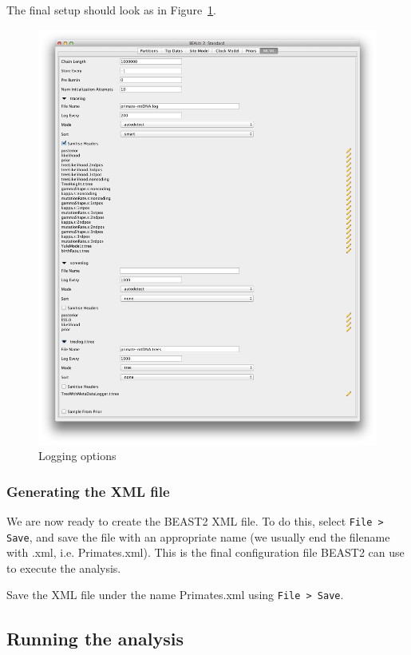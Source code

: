 \documentclass[11pt]{article}
\begin{document}
The final setup should look as in Figure~\ref{fig:logs}.

\begin{figure}[H]
\centering
\includegraphics[width=5in]{figures/logs.png}
\caption{\small Logging options}
\label{fig:logs}
\end{figure}

\subsubsection{Generating the XML file}

We are now ready to create the BEAST2 XML file. To do this, select \texttt{File > Save}, and save the file with an appropriate name (we usually end the filename with .xml, i.e. Primates.xml). This is the final configuration file BEAST2 can use to execute the analysis.

\begin{framed}
Save the XML file under the name Primates.xml using \texttt{File > Save}.
\end{framed}

\subsection{Running the analysis}
\end{document}
